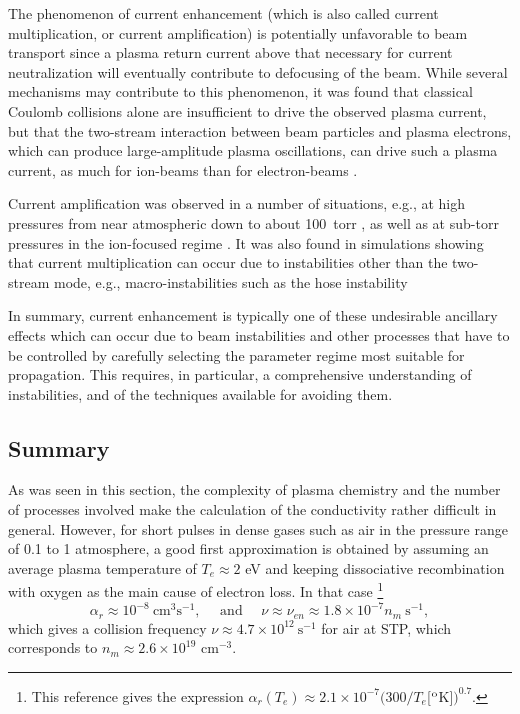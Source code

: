 \documentclass [12pt,a4paper,     ]{report} %
\begin{document}
   The phenomenon of current enhancement (which is also called current multiplication, or current amplification) is potentially unfavorable to beam transport since a plasma return current above that necessary for current neutralization will eventually contribute to defocusing of the beam.  While several mechanisms may contribute to this phenomenon, it was found that classical Coulomb collisions alone are insufficient to drive the observed plasma current, but that the two-stream interaction between beam particles and plasma electrons, which can produce large-amplitude plasma oscillations, can drive such a plasma current, as much for ion-beams \cite{SUDAN1976-} than for electron-beams \cite{CHAMB1979B}.

   Current amplification was observed in a number of situations, e.g., at high pressures from near atmospheric \cite{IPATO1984-} down to about 100~torr \cite[Refs.~1-4]{LAU--1985-}, as well as at sub-torr pressures in the ion-focused regime \cite{PAITH1988-}.  It was also found in simulations showing that current multiplication can occur due to instabilities other than the two-stream mode, e.g., macro-instabilities such as the hose instability \cite{LAU--1985-, HUI--1985-, FERNS1986-}

   In summary, current enhancement is typically one of these undesirable ancillary effects which can occur due to beam instabilities and other processes that have to be controlled by carefully selecting the parameter regime most suitable for propagation.  This requires, in particular, a comprehensive understanding of instabilities, and of the techniques available for avoiding them.

\subsection{Summary}

	As was seen in this section, the complexity of plasma chemistry and the number of processes involved make the calculation of the conductivity rather difficult in general.  However, for short pulses in dense gases such as air in the pressure range of 0.1 to 1 atmosphere, a good first approximation is obtained by assuming an average plasma temperature of $T_e \approx 2$ eV and keeping dissociative recombination with oxygen as the main cause of electron loss.  In that case \cite{CHAMB1981-}\footnote{This reference gives the expression $\alpha_r(T_e) \approx 2.1 \times 10^{-7} (300/T_e$[$^{\rm{o}}$K]$)^{0.7}$.}
%
\begin{equation}\label{pla:26} %
     \alpha_r \approx 10^{-8} ~ \text{cm}^3\text{s}^{-1},
                                         ~~~ ~~~ \text{and} ~~~ ~~~
     \nu \approx \nu_{en} \approx 1.8  \times 10^{-7} n_m ~ \text{s}^{-1},
\end{equation}
%
which gives a collision frequency $\nu\approx 4.7 \times 10^{12} ~ \text{s}^{-1}$ for air at STP, which corresponds to $n_m \approx  2.6 \times 10^{19}$ cm$^{-3}$.
\end{document}
